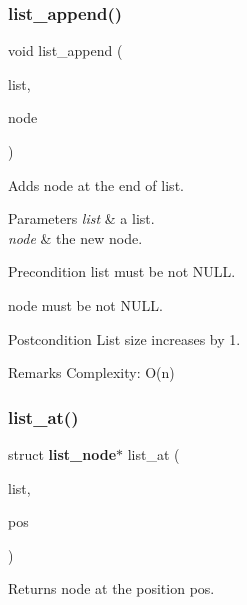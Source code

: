 \subsubsection{list\+\_\+append()}
{\footnotesize\ttfamily void list\+\_\+append (\begin{DoxyParamCaption}\item[{struct \textbf{ list} $\ast$}]{list,  }\item[{struct \textbf{ list\+\_\+node} $\ast$}]{node }\end{DoxyParamCaption})\hspace{0.3cm}{\ttfamily [inline]}}

Adds {\ttfamily node} at the end of {\ttfamily list}.


\begin{DoxyParams}{Parameters}
{\em list} & a list. \\
\hline
{\em node} & the new node.\\
\hline
\end{DoxyParams}
\begin{DoxyPrecond}{Precondition}
{\ttfamily list} must be not N\+U\+LL. 

{\ttfamily node} must be not N\+U\+LL.
\end{DoxyPrecond}
\begin{DoxyPostcond}{Postcondition}
List size increases by 1.
\end{DoxyPostcond}
\begin{DoxyRemark}{Remarks}
Complexity\+: O(n) 
\end{DoxyRemark}
\mbox{\label{list_8h_abcf02e7a58093a7b70a84be889da4aad}} 
\subsubsection{list\+\_\+at()}
{\footnotesize\ttfamily struct \textbf{ list\+\_\+node}$\ast$ list\+\_\+at (\begin{DoxyParamCaption}\item[{const struct \textbf{ list} $\ast$}]{list,  }\item[{size\+\_\+t}]{pos }\end{DoxyParamCaption})}

Returns node at the position {\ttfamily pos}.


